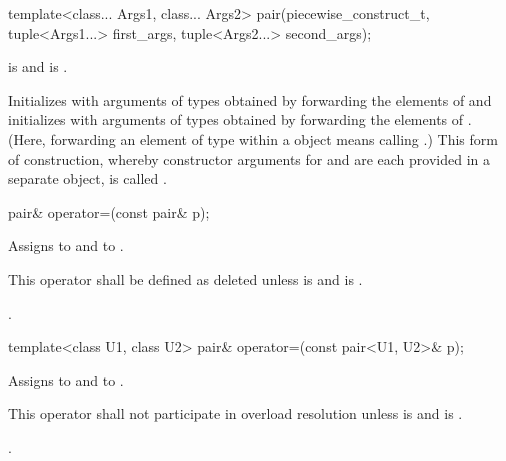 %
\begin{itemdecl}
template<class... Args1, class... Args2>
  pair(piecewise_construct_t, tuple<Args1...> first_args, tuple<Args2...> second_args);
\end{itemdecl}

\begin{itemdescr}
\pnum
\requires {} is 
and  is .

\pnum
\effects Initializes  with arguments of types
 obtained by forwarding the elements of 
and initializes  with arguments of types 
obtained by forwarding the elements of . (Here, forwarding
an element  of type  within a  object means calling
.) This form of construction, whereby constructor
arguments for  and  are each provided in a separate
 object, is called .
\end{itemdescr}

%
\begin{itemdecl}
pair& operator=(const pair& p);
\end{itemdecl}

\begin{itemdescr}
\pnum
\effects Assigns  to  and  to .

\pnum
\remarks This operator shall be defined as deleted unless
 is 
and  is .

\pnum
\returns {}.
\end{itemdescr}

%
\begin{itemdecl}
template<class U1, class U2> pair& operator=(const pair<U1, U2>& p);
\end{itemdecl}

\begin{itemdescr}
\pnum
\effects Assigns  to  and  to .

\pnum
\remarks This operator shall not participate in overload resolution unless
 is 
and  is .

\pnum
\returns {}.
\end{itemdescr}


